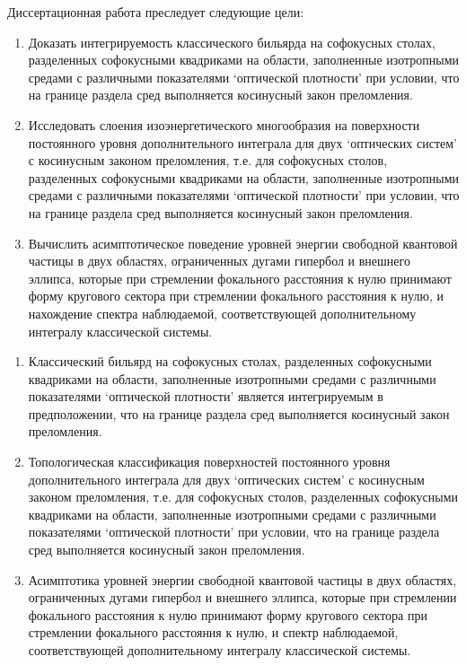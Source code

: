 {\aim} 
Диссертационная работа преследует следующие цели:
\begin{enumerate}[beginpenalty=10000] %
  \item Доказать интегрируемость классического бильярда на софокусных столах, разделенных софокусными квадриками на области, заполненные изотропными средами с различными показателями `оптической плотности' при условии, что на границе раздела сред выполняется косинусный закон преломления.
 \item Исследовать слоения изоэнергетического многообразия на поверхности постоянного уровня дополнительного интеграла для двух `оптических систем' с косинусным законом преломления, т.е. для софокусных столов, разделенных софокусными квадриками на области, заполненные изотропными средами с различными показателями `оптической плотности'  при условии, что на границе раздела сред выполняется косинусный закон преломления.
   \item Вычислить асимптотическое поведение уровней энергии свободной квантовой частицы в двух областях, ограниченных дугами гипербол и внешнего эллипса, которые при стремлении фокального расстояния к нулю принимают форму кругового сектора при стремлении фокального расстояния к нулю, и нахождение спектра наблюдаемой, соответствующей дополнительному интегралу классической системы.
\end{enumerate}

{}
\begin{enumerate}[beginpenalty=10000] %
  \item Классический бильярд на софокусных столах, разделенных софокусными квадриками на области, заполненные изотропными средами с различными показателями `оптической плотности' является интегрируемым в предположении, что на границе раздела сред выполняется косинусный закон преломления.
 \item Топологическая классификация поверхностей постоянного уровня дополнительного интеграла для двух `оптических систем' с косинусным законом преломления, т.е. для софокусных столов, разделенных софокусными квадриками на области, заполненные изотропными средами с различными показателями `оптической плотности'  при условии, что на границе раздела сред выполняется косинусный закон преломления.
   \item Асимптотика уровней энергии свободной квантовой частицы в двух областях, ограниченных дугами гипербол и внешнего эллипса, которые при стремлении фокального расстояния к нулю принимают форму кругового сектора при стремлении фокального расстояния к нулю, и  спектр наблюдаемой, соответствующей дополнительному интегралу классической системы.
\end{enumerate}


